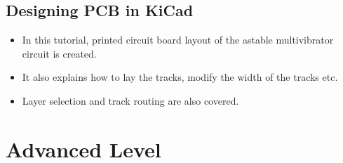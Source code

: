\subsection{Designing PCB in KiCad}

\begin{itemize}
\item In this tutorial, printed circuit board layout of the astable multivibrator circuit is created.
\item It also explains how to lay the tracks, modify the width of the tracks etc.
\item Layer selection and track routing are also covered.
\end{itemize}

\section{Advanced Level}


